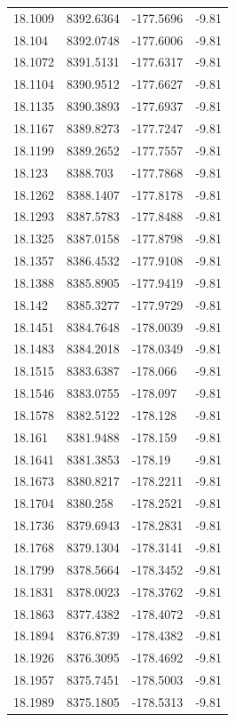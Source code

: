 \begin{table}[H]
\begin{tabular}{llll}
18.1009 & 8392.6364 & -177.5696 & -9.81 \\
18.104 & 8392.0748 & -177.6006 & -9.81 \\
18.1072 & 8391.5131 & -177.6317 & -9.81 \\
18.1104 & 8390.9512 & -177.6627 & -9.81 \\
18.1135 & 8390.3893 & -177.6937 & -9.81 \\
18.1167 & 8389.8273 & -177.7247 & -9.81 \\
18.1199 & 8389.2652 & -177.7557 & -9.81 \\
18.123 & 8388.703 & -177.7868 & -9.81 \\
18.1262 & 8388.1407 & -177.8178 & -9.81 \\
18.1293 & 8387.5783 & -177.8488 & -9.81 \\
18.1325 & 8387.0158 & -177.8798 & -9.81 \\
18.1357 & 8386.4532 & -177.9108 & -9.81 \\
18.1388 & 8385.8905 & -177.9419 & -9.81 \\
18.142 & 8385.3277 & -177.9729 & -9.81 \\
18.1451 & 8384.7648 & -178.0039 & -9.81 \\
18.1483 & 8384.2018 & -178.0349 & -9.81 \\
18.1515 & 8383.6387 & -178.066 & -9.81 \\
18.1546 & 8383.0755 & -178.097 & -9.81 \\
18.1578 & 8382.5122 & -178.128 & -9.81 \\
18.161 & 8381.9488 & -178.159 & -9.81 \\
18.1641 & 8381.3853 & -178.19 & -9.81 \\
18.1673 & 8380.8217 & -178.2211 & -9.81 \\
18.1704 & 8380.258 & -178.2521 & -9.81 \\
18.1736 & 8379.6943 & -178.2831 & -9.81 \\
18.1768 & 8379.1304 & -178.3141 & -9.81 \\
18.1799 & 8378.5664 & -178.3452 & -9.81 \\
18.1831 & 8378.0023 & -178.3762 & -9.81 \\
18.1863 & 8377.4382 & -178.4072 & -9.81 \\
18.1894 & 8376.8739 & -178.4382 & -9.81 \\
18.1926 & 8376.3095 & -178.4692 & -9.81 \\
18.1957 & 8375.7451 & -178.5003 & -9.81 \\
18.1989 & 8375.1805 & -178.5313 & -9.81 \\

\end{tabular}
\end{table}
